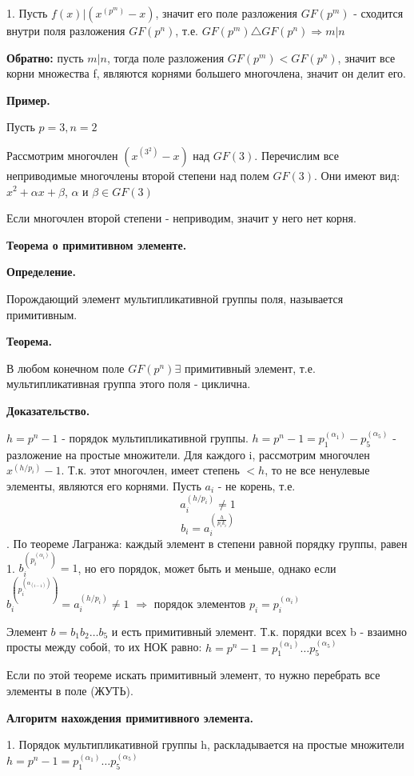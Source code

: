 \documentclass{article}
\begin{document}
1. Пусть $f(x)|(x^(p^m)-x)$, значит его поле разложения $GF(p^m)$ - сходится внутри поля разложения $GF(p^n)$, т.е. $GF(p^m)\triangle GF(p^n) \Rightarrow m|n$

{\bf Обратно:} пусть $m|n$, тогда поле разложения $GF(p^m)<GF(p^n)$, значит все корни множества f, являются корнями большего многочлена, значит он делит его.

{\bf Пример.}

Пусть $p=3, n=2$

Рассмотрим многочлен $(x^(3^2)-x)$ над $GF(3)$. Перечислим все неприводимые многочлены второй степени над полем $GF(3)$. Они имеют вид: $x^2+\alpha x +\beta$, $\alpha$ и $\beta \in GF(3)$

Если многочлен второй степени - неприводим, значит у него нет корня.

{\bf Теорема о примитивном элементе.}

{\bf Определение.}

Порождающий элемент мультипликативной группы поля, называется примитивным.

{\bf Теорема.}

В любом конечном поле $GF(p^n)  \exists$ примитивный элемент, т.е. мультипликативная группа этого поля - циклична.

{\bf Доказательство.}

$h=p^n-1$ - порядок мультипликативной группы. $h=p^n-1=p^(\alpha_1)_1 - p^(\alpha_5)_5$ - разложение на простые множители. Для каждого i, рассмотрим многочлен $x^(h/p_i)-1$. Т.к. этот многочлен, имеет степень $<h$, то не все ненулевые элементы, являются его корнями. Пусть $a_i$ - не корень, т.е. $$a^(h/p_i)_i \ne 1$$
$$b_i=a^(\frac{h}{p_i k_i})_i$$. По теореме Лагранжа: каждый элемент в степени равной порядку группы, равен 1. $b^(p^(\alpha_i)_i)_i=1$, но его порядок, может быть и меньше, однако если $b^(p^(\alpha_(i-1))_i)_i=a^(h/p_i)_i \ne 1$ $\Rightarrow$ порядок элементов $p_i=p^(\alpha_i)_i$

Элемент $b=b_1b_2\ldots b_5$ и есть примитивный элемент. Т.к. порядки всех b - взаимно просты между собой, то их НОК равно: $h=p^n-1=p^(\alpha_1)_1 \ldots p^(\alpha_5)_5$

Если по этой теореме искать примитивный элемент, то нужно перебрать все элементы в поле (ЖУТЬ).

{\bf Алгоритм нахождения примитивного элемента.}

1. Порядок мультипликативной группы h, раскладывается на простые множители $h=p^n-1=p^(\alpha_1)_1 \ldots p^(\alpha_5)_5$
\end{document}

